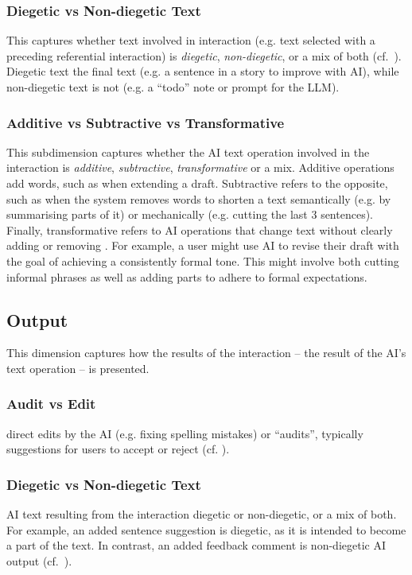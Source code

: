 \subsubsection{Diegetic vs Non-diegetic Text}
This captures whether text involved in interaction (e.g. text selected with a preceding referential interaction) is \textit{diegetic}, \textit{non-diegetic}, or a mix of both (cf.~\cite{Buschek2024collage, Dang2023choice}). Diegetic text  the final text (e.g. a sentence in a story to improve with AI), while non-diegetic text is not (e.g. a ``todo'' note or prompt for the LLM).

\subsubsection{Additive vs Subtractive vs Transformative}
This subdimension captures whether the AI text operation involved in the interaction is \textit{additive}, \textit{subtractive}, \textit{transformative} or a mix. Additive operations add words, such as when extending a draft. Subtractive refers to the opposite, such as when the system removes words to shorten a text semantically (e.g. by summarising parts of it) or mechanically (e.g. cutting the last 3 sentences). Finally, transformative refers to AI operations that change text without clearly adding or removing . For example, a user might use AI to revise their draft with the goal of achieving a consistently formal tone. This might involve both cutting informal phrases as well as adding parts to adhere to formal expectations.


\subsection{Output}
This dimension captures how the results of the interaction -- the result of the AI's text operation -- is presented.

\subsubsection{Audit vs Edit} 
 direct edits by the AI (e.g. fixing spelling mistakes) or ``audits'', typically suggestions for users to accept or reject (cf. \cite{Cooper2014aboutface}). 

\subsubsection{Diegetic vs Non-diegetic Text}
AI text resulting from the interaction  diegetic or non-diegetic, or a mix of both. For example, an added sentence suggestion is diegetic, as it is intended to become a part of the text. In contrast, an added feedback comment is non-diegetic AI output (cf.~\cite{Buschek2024collage}).

